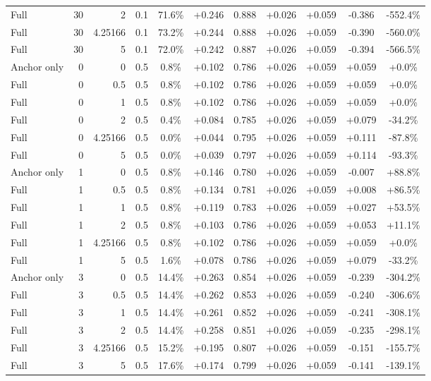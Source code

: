 \begin{table}[htbp]
\begin{tabular}{lrrrccccccc}
Full & 30 & 2 & 0.1 & 71.6\% & +0.246 & 0.888 & +0.026 & +0.059 & -0.386 & -552.4\% \\
Full & 30 & 4.25166 & 0.1 & 73.2\% & +0.244 & 0.888 & +0.026 & +0.059 & -0.390 & -560.0\% \\
Full & 30 & 5 & 0.1 & 72.0\% & +0.242 & 0.887 & +0.026 & +0.059 & -0.394 & -566.5\% \\
Anchor only & 0 & 0 & 0.5 & 0.8\% & +0.102 & 0.786 & +0.026 & +0.059 & +0.059 & +0.0\% \\
Full & 0 & 0.5 & 0.5 & 0.8\% & +0.102 & 0.786 & +0.026 & +0.059 & +0.059 & +0.0\% \\
Full & 0 & 1 & 0.5 & 0.8\% & +0.102 & 0.786 & +0.026 & +0.059 & +0.059 & +0.0\% \\
Full & 0 & 2 & 0.5 & 0.4\% & +0.084 & 0.785 & +0.026 & +0.059 & +0.079 & -34.2\% \\
Full & 0 & 4.25166 & 0.5 & 0.0\% & +0.044 & 0.795 & +0.026 & +0.059 & +0.111 & -87.8\% \\
Full & 0 & 5 & 0.5 & 0.0\% & +0.039 & 0.797 & +0.026 & +0.059 & +0.114 & -93.3\% \\
Anchor only & 1 & 0 & 0.5 & 0.8\% & +0.146 & 0.780 & +0.026 & +0.059 & -0.007 & +88.8\% \\
Full & 1 & 0.5 & 0.5 & 0.8\% & +0.134 & 0.781 & +0.026 & +0.059 & +0.008 & +86.5\% \\
Full & 1 & 1 & 0.5 & 0.8\% & +0.119 & 0.783 & +0.026 & +0.059 & +0.027 & +53.5\% \\
Full & 1 & 2 & 0.5 & 0.8\% & +0.103 & 0.786 & +0.026 & +0.059 & +0.053 & +11.1\% \\
Full & 1 & 4.25166 & 0.5 & 0.8\% & +0.102 & 0.786 & +0.026 & +0.059 & +0.059 & +0.0\% \\
Full & 1 & 5 & 0.5 & 1.6\% & +0.078 & 0.786 & +0.026 & +0.059 & +0.079 & -33.2\% \\
Anchor only & 3 & 0 & 0.5 & 14.4\% & +0.263 & 0.854 & +0.026 & +0.059 & -0.239 & -304.2\% \\
Full & 3 & 0.5 & 0.5 & 14.4\% & +0.262 & 0.853 & +0.026 & +0.059 & -0.240 & -306.6\% \\
Full & 3 & 1 & 0.5 & 14.4\% & +0.261 & 0.852 & +0.026 & +0.059 & -0.241 & -308.1\% \\
Full & 3 & 2 & 0.5 & 14.4\% & +0.258 & 0.851 & +0.026 & +0.059 & -0.235 & -298.1\% \\
Full & 3 & 4.25166 & 0.5 & 15.2\% & +0.195 & 0.807 & +0.026 & +0.059 & -0.151 & -155.7\% \\
Full & 3 & 5 & 0.5 & 17.6\% & +0.174 & 0.799 & +0.026 & +0.059 & -0.141 & -139.1\% \\

\end{tabular}
\end{table}
